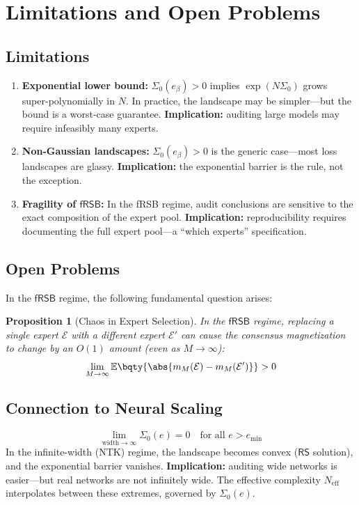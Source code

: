 \documentclass[12pt,a4paper]{article}
\newtheorem{proposition}[theorem]{Proposition}
\newcommand{\E}{\mathbb{E}}
\newcommand{\RS}{\mathsf{RS}}
\newcommand{\fRSB}{\mathsf{fRSB}}
\begin{document}
\section{Limitations and Open Problems}
\subsection{Limitations}
\begin{enumerate}[label=\textbf{L\arabic*}, leftmargin=*]
    \item \textbf{Exponential lower bound:} \(\Sigma_0(e_\beta) > 0\) implies \(\exp(N\Sigma_0)\) grows super-polynomially in \(N\). In practice, the landscape may be simpler---but the bound is a worst-case guarantee. \textbf{Implication:} auditing large models may require infeasibly many experts.
    \item \textbf{Non-Gaussian landscapes:} \(\Sigma_0(e_\beta) > 0\) is the generic case---most loss landscapes are glassy. \textbf{Implication:} the exponential barrier is the rule, not the exception.
    \item \textbf{Fragility of \(\fRSB\):} In the fRSB regime, audit conclusions are sensitive to the exact composition of the expert pool. \textbf{Implication:} reproducibility requires documenting the full expert pool---a ``which experts'' specification.
\end{enumerate}

\subsection{Open Problems}
In the \(\fRSB\) regime, the following fundamental question arises:
\begin{proposition}[Chaos in Expert Selection]\label{prop:chaos}
In the \(\fRSB\) regime, replacing a single expert \(\mathcal{E}\) with a different expert \(\mathcal{E}'\) can cause the consensus magnetization to change by an \(O(1)\) amount (even as \(M \to \infty\)):
\begin{equation}\label{eq:chaos}
\lim_{M \to \infty} \E\bqty{\abs{m_M(\mathcal{E}) - m_M(\mathcal{E}')}} > 0
\end{equation}
\end{proposition}

\subsection{Connection to Neural Scaling}
\begin{equation}
\lim_{\text{width} \to \infty} \Sigma_0(e) = 0 \quad \text{for all } e > e_{\min}
\end{equation}
In the infinite-width (NTK) regime, the landscape becomes convex (\(\RS\) solution), and the exponential barrier vanishes. \textbf{Implication:} auditing wide networks is easier---but real networks are not infinitely wide. The effective complexity \(N_{\text{eff}}\) interpolates between these extremes, governed by \(\Sigma_0(e)\).
\end{document}
